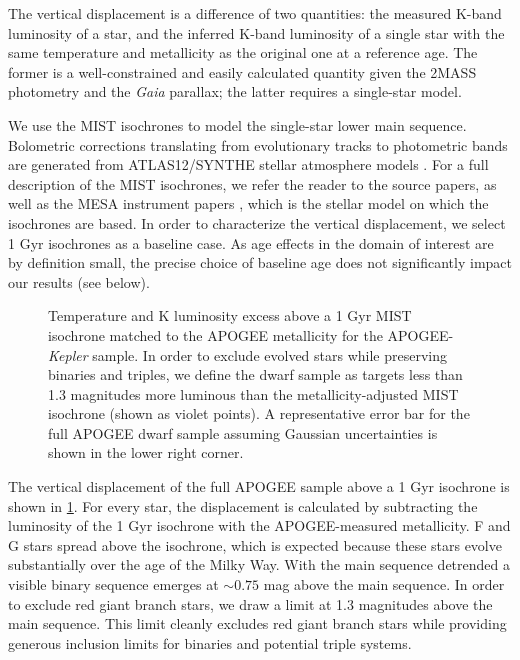 \documentclass[manuscript]{aastex6}
\newcommand{\Kepler}{\mbox{\textit{Kepler}}}
\newcommand{\Gaia}{\mbox{\textit{Gaia}}}
\begin{document}
The vertical displacement is a difference of two quantities: the measured 
K-band luminosity of a star, and the inferred K-band luminosity of a single 
star with the same temperature and metallicity as the original one at a reference age. The 
former is a well-constrained and easily calculated quantity given the 2MASS 
photometry and the \Gaia{} parallax; the latter requires a single-star model.

We use the MIST \citep{Dotter16,Choi16} isochrones to model the 
single-star lower main sequence. Bolometric corrections translating from
evolutionary tracks to photometric bands are generated from ATLAS12/SYNTHE
stellar atmosphere models \citep{Kurucz70,Kurucz93}. For a full description of the MIST isochrones, we 
refer the reader to the source papers, as well as the MESA instrument papers 
\citep{Paxton11, Paxton13, Paxton15}, which is the stellar model on which the 
isochrones are based. In order to characterize the vertical displacement, we select 1 Gyr isochrones
as a baseline case. As age effects in the domain of interest are by definition
small, the precise choice of baseline age does not significantly impact our 
results (see below).

\begin{figure}[htb]
    \centering
    \caption{Temperature and K luminosity excess above a 1 Gyr MIST isochrone 
        matched to the APOGEE metallicity for the APOGEE-\Kepler{} sample. 
        In order to exclude evolved stars while preserving binaries and
        triples, we define the dwarf sample as targets less than 1.3 magnitudes
        more luminous than the metallicity-adjusted MIST isochrone (shown as
        violet points). A representative error bar for the 
        full APOGEE dwarf sample assuming Gaussian uncertainties is shown in 
        the lower right corner.}\label{fig:sample_dk}
\end{figure}


The vertical displacement of the full APOGEE sample above a 1 Gyr isochrone is 
shown in \cref{fig:sample_dk}. For every star, the displacement is calculated 
by subtracting the luminosity of the 1 Gyr isochrone with the APOGEE-measured 
metallicity. F and G stars spread above the isochrone, which is 
expected because these stars evolve substantially over the age of the Milky
Way. With the main sequence detrended a visible binary sequence emerges at 
\(\sim0.75\) mag above the main sequence. In order to exclude red 
giant branch stars, we draw a limit at 1.3 magnitudes above the main sequence. 
This limit cleanly excludes red giant branch stars while providing generous 
inclusion limits for binaries and potential triple systems.
\end{document}
